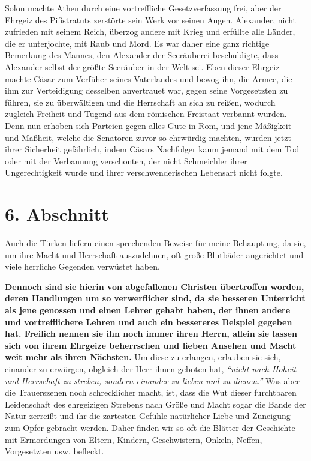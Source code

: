\medskip

Solon machte Athen durch eine
vortreffliche Gesetzverfassung frei, aber der
Ehrgeiz des Pifistratuts zerstörte sein Werk vor
seinen Augen. Alexander, nicht
zufrieden mit seinem Reich, überzog andere mit Krieg und erfüllte alle Länder,
die er unterjochte, mit Raub und Mord. Es war daher eine ganz richtige Bemerkung
des Mannes, den Alexander der Seeräuberei beschuldigte, dass Alexander selbst
der größte Seeräuber in der Welt sei. Eben dieser Ehrgeiz machte
Cäsar zum
Verfüher seines Vaterlandes und bewog ihn, die Armee, die ihm zur
Verteidigung desselben anvertrauet war, gegen seine Vorgesetzten zu führen, sie
zu überwältigen und die Herrschaft an sich zu reißen, wodurch zugleich Freiheit
und Tugend aus dem römischen Freistaat verbannt
wurden. Denn nun erhoben sich
Parteien gegen alles Gute in Rom, und jene Mäßigkeit und
Maßheit, welche die
Senatoren zuvor so ehrwürdig machten, wurden
jetzt ihrer Sicherheit gefährlich,
indem Cäsars Nachfolger kaum jemand mit dem Tod oder mit der Verbannung
verschonten, der nicht Schmeichler ihrer Ungerechtigkeit wurde und ihrer
verschwenderischen Lebensart nicht folgte.

\section{6. Abschnitt} \label{kap8_ab6}

Auch die Türken liefern einen sprechenden Beweise für
meine Behauptung, da sie,
um ihre Macht und Herrschaft auszudehnen, oft große Blutbäder angerichtet und
viele herrliche Gegenden verwüstet haben.

\medskip

\label{ref:08_06_heiden}\textbf{Dennoch sind sie hierin von abgefallenen
Christen übertroffen worden, deren
Handlungen um so verwerflicher sind, da sie besseren Unterricht als jene
genossen
und einen Lehrer gehabt haben, der ihnen andere und vortrefflichere Lehren und
auch ein bessereres Beispiel gegeben hat. Freilich nennen sie ihn noch immer
ihren
Herrn, allein sie lassen sich von ihrem Ehrgeize beherrschen und lieben Ansehen
und Macht weit mehr als ihren Nächsten.} Um diese zu
erlangen, erlauben sie sich,
einander zu erwürgen, obgleich der Herr ihnen
geboten hat,
\textit{"`nicht nach Hoheit
und Herrschaft zu streben, sondern einander zu lieben und zu
dienen."'}
Was aber die Trauerszenen noch schrecklicher
macht, ist, dass die Wut dieser furchtbaren Leidenschaft des ehrgeizigen
Strebens nach Größe und Macht sogar die Bande der Natur zerreißt und ihr die
zartesten Gefühle natürlicher Liebe und Zuneigung zum Opfer gebracht werden.
Daher finden wir so oft die Blätter der Geschichte mit Ermordungen von Eltern,
Kindern, Geschwistern, Onkeln, Neffen, Vorgesetzten usw. befleckt.

